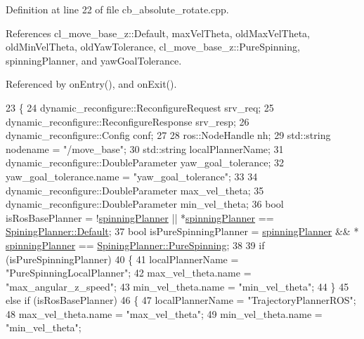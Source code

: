 Definition at line 22 of file cb\+\_\+absolute\+\_\+rotate.\+cpp.



References cl\+\_\+move\+\_\+base\+\_\+z\+::\+Default, max\+Vel\+Theta, old\+Max\+Vel\+Theta, old\+Min\+Vel\+Theta, old\+Yaw\+Tolerance, cl\+\_\+move\+\_\+base\+\_\+z\+::\+Pure\+Spinning, spinning\+Planner, and yaw\+Goal\+Tolerance.



Referenced by on\+Entry(), and on\+Exit().


\begin{DoxyCode}
23 \{
24   dynamic\_reconfigure::ReconfigureRequest srv\_req;
25   dynamic\_reconfigure::ReconfigureResponse srv\_resp;
26   dynamic\_reconfigure::Config conf;
27 
28   ros::NodeHandle nh;
29   std::string nodename = \textcolor{stringliteral}{"/move\_base"};
30   std::string localPlannerName;
31   dynamic\_reconfigure::DoubleParameter yaw\_goal\_tolerance;
32   yaw\_goal\_tolerance.name = \textcolor{stringliteral}{"yaw\_goal\_tolerance"};
33 
34   dynamic\_reconfigure::DoubleParameter max\_vel\_theta;
35   dynamic\_reconfigure::DoubleParameter min\_vel\_theta;
36   \textcolor{keywordtype}{bool} isRosBasePlanner = !\hyperlink{classcl__move__base__z_1_1CbAbsoluteRotate_a17d836524599af072cf2e3488e491a91}{spinningPlanner} || *\hyperlink{classcl__move__base__z_1_1CbAbsoluteRotate_a17d836524599af072cf2e3488e491a91}{spinningPlanner} == 
      \hyperlink{namespacecl__move__base__z_aab2ad3041275145f0065fb60b3299345a7a1920d61156abc05a60135aefe8bc67}{SpiningPlanner::Default};
37   \textcolor{keywordtype}{bool} isPureSpinningPlanner = \hyperlink{classcl__move__base__z_1_1CbAbsoluteRotate_a17d836524599af072cf2e3488e491a91}{spinningPlanner} && *
      \hyperlink{classcl__move__base__z_1_1CbAbsoluteRotate_a17d836524599af072cf2e3488e491a91}{spinningPlanner} == \hyperlink{namespacecl__move__base__z_aab2ad3041275145f0065fb60b3299345aada5274435681a4ce04175bebfa6652f}{SpiningPlanner::PureSpinning};
38 
39   \textcolor{keywordflow}{if} (isPureSpinningPlanner)
40   \{
41     localPlannerName = \textcolor{stringliteral}{"PureSpinningLocalPlanner"};
42     max\_vel\_theta.name = \textcolor{stringliteral}{"max\_angular\_z\_speed"};
43     min\_vel\_theta.name = \textcolor{stringliteral}{"min\_vel\_theta"};
44   \}
45   \textcolor{keywordflow}{else} \textcolor{keywordflow}{if} (isRosBasePlanner)
46   \{
47     localPlannerName = \textcolor{stringliteral}{"TrajectoryPlannerROS"};
48     max\_vel\_theta.name = \textcolor{stringliteral}{"max\_vel\_theta"};
49     min\_vel\_theta.name = \textcolor{stringliteral}{"min\_vel\_theta"};

\end{DoxyCode}
